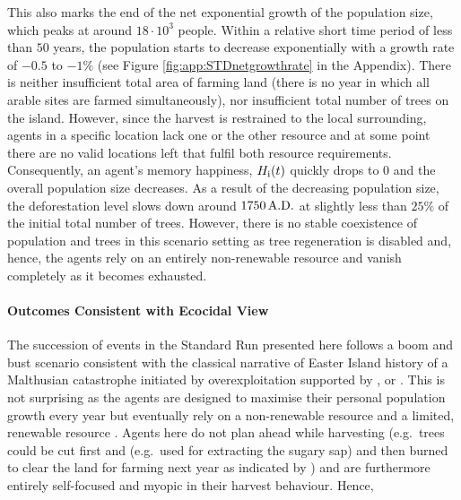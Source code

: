 This also marks the end of the net exponential growth of the population size, which peaks at around $18\cdot 10^3$ people.
Within a relative short time period of less than $50$ years, the population starts to decrease exponentially with a growth rate of $-0.5$ to $-1\%$ (see Figure \ref{fig:app:STDnetgrowthrate} in the Appendix).
There is neither insufficient total area of farming land (there is no year in which all arable sites are farmed simultaneously), nor insufficient total number of trees on the island.
However, since the harvest is restrained to the local surrounding, agents in a specific location lack one or the other resource and at some point there are no valid locations left that fulfil both resource requirements.
Consequently, an agent's memory happiness, $H_{\rm i}(t)$ quickly drops to $0$ and the overall population size decreases.
As a result of the decreasing population size, the deforestation level slows down around $1750\, {\rm A.D.}$ at slightly less than $25\%$ of the initial total number of trees. 
However, there is no stable coexistence of population and trees in this scenario setting as tree regeneration is disabled and, hence, the agents rely on an entirely non-renewable resource and vanish completely as it becomes exhausted.


\paragraph{Outcomes Consistent with Ecocidal View}
The succession of events in the Standard Run presented here follows a boom and bust scenario consistent with the classical narrative of Easter Island history of a Malthusian catastrophe initiated by overexploitation supported by \citet{Brander1998}, \citet{Diamond2011} or \citet{Bahn2017}.
This is not surprising as the agents are designed to maximise their personal population growth every year but eventually rely on a non-renewable resource and a limited, renewable resource .
Agents here do not plan ahead while harvesting (e.g.\ trees could be cut first and (e.g.\ used for extracting the sugary sap) and then burned to clear the land for farming next year as indicated by \citet{Mieth2015}) and are furthermore entirely self-focused and myopic in their harvest behaviour.
Hence, 

